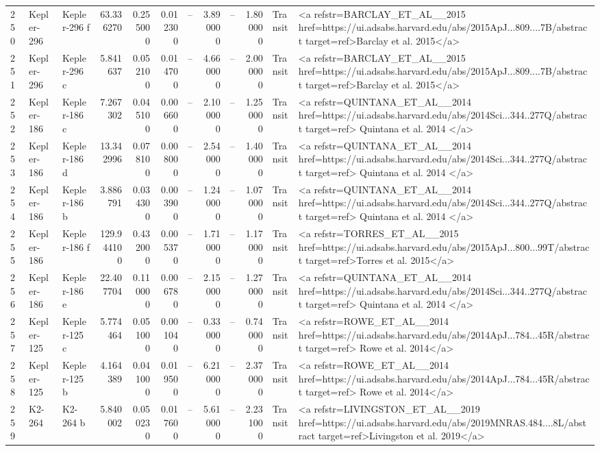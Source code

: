 \begin{tabular}{lllrrrrrrrll}
250 & Kepler-296 & Kepler-296 f & 63.336270 & 0.255000 & 0.012300 & -- & 3.890000 & -- & 1.800000 & Transit & <a refstr=BARCLAY_ET_AL__2015 href=https://ui.adsabs.harvard.edu/abs/2015ApJ...809....7B/abstract target=ref>Barclay et al. 2015</a> \\
251 & Kepler-296 & Kepler-296 c & 5.841637 & 0.052100 & 0.014700 & -- & 4.660000 & -- & 2.000000 & Transit & <a refstr=BARCLAY_ET_AL__2015 href=https://ui.adsabs.harvard.edu/abs/2015ApJ...809....7B/abstract target=ref>Barclay et al. 2015</a> \\
252 & Kepler-186 & Kepler-186 c & 7.267302 & 0.045100 & 0.006600 & -- & 2.100000 & -- & 1.250000 & Transit & <a refstr=QUINTANA_ET_AL__2014 href=https://ui.adsabs.harvard.edu/abs/2014Sci...344..277Q/abstract target=ref> Quintana et al. 2014 </a> \\
253 & Kepler-186 & Kepler-186 d & 13.342996 & 0.078100 & 0.008000 & -- & 2.540000 & -- & 1.400000 & Transit & <a refstr=QUINTANA_ET_AL__2014 href=https://ui.adsabs.harvard.edu/abs/2014Sci...344..277Q/abstract target=ref> Quintana et al. 2014 </a> \\
254 & Kepler-186 & Kepler-186 b & 3.886791 & 0.034300 & 0.003900 & -- & 1.240000 & -- & 1.070000 & Transit & <a refstr=QUINTANA_ET_AL__2014 href=https://ui.adsabs.harvard.edu/abs/2014Sci...344..277Q/abstract target=ref> Quintana et al. 2014 </a> \\
255 & Kepler-186 & Kepler-186 f & 129.944100 & 0.432000 & 0.005370 & -- & 1.710000 & -- & 1.170000 & Transit & <a refstr=TORRES_ET_AL__2015 href=https://ui.adsabs.harvard.edu/abs/2015ApJ...800...99T/abstract target=ref>Torres et al. 2015</a> \\
256 & Kepler-186 & Kepler-186 e & 22.407704 & 0.110000 & 0.006780 & -- & 2.150000 & -- & 1.270000 & Transit & <a refstr=QUINTANA_ET_AL__2014 href=https://ui.adsabs.harvard.edu/abs/2014Sci...344..277Q/abstract target=ref> Quintana et al. 2014 </a> \\
257 & Kepler-125 & Kepler-125 c & 5.774464 & 0.051000 & 0.001040 & -- & 0.330000 & -- & 0.740000 & Transit & <a refstr=ROWE_ET_AL__2014 href=https://ui.adsabs.harvard.edu/abs/2014ApJ...784...45R/abstract target=ref> Rowe et al. 2014</a> \\
258 & Kepler-125 & Kepler-125 b & 4.164389 & 0.041000 & 0.019500 & -- & 6.210000 & -- & 2.370000 & Transit & <a refstr=ROWE_ET_AL__2014 href=https://ui.adsabs.harvard.edu/abs/2014ApJ...784...45R/abstract target=ref> Rowe et al. 2014</a> \\
259 & K2-264 & K2-264 b & 5.840002 & 0.050230 & 0.017600 & -- & 5.610000 & -- & 2.231000 & Transit & <a refstr=LIVINGSTON_ET_AL__2019 href=https://ui.adsabs.harvard.edu/abs/2019MNRAS.484....8L/abstract target=ref>Livingston et al. 2019</a> \\

\end{tabular}

